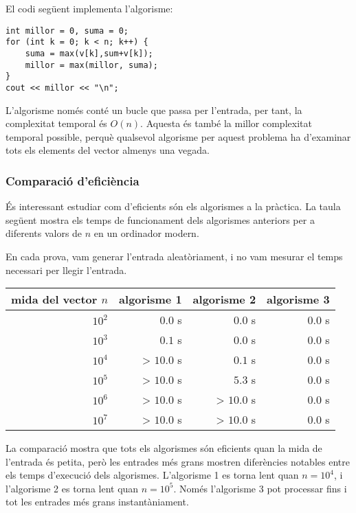 El codi següent implementa l'algorisme:
\begin{lstlisting}
int millor = 0, suma = 0;
for (int k = 0; k < n; k++) {
    suma = max(v[k],sum+v[k]);
    millor = max(millor, suma);
}
cout << millor << "\n";
\end{lstlisting}

L'algorisme només conté un bucle
que passa per l'entrada,
per tant, la complexitat temporal és $O(n)$.
Aquesta és també la millor complexitat temporal possible,
perquè qualsevol algorisme per aquest problema
ha d'examinar tots els elements del vector almenys una vegada.

\subsubsection{Comparació d'eficiència}

És interessant estudiar com d'eficients són
els algorismes a la pràctica.
La taula següent mostra els temps de funcionament
dels algorismes anteriors per a diferents
valors de $n$ en un ordinador modern.

En cada prova, vam generar l'entrada aleatòriament, i
no vam mesurar el temps necessari per llegir l'entrada.

\begin{center}
\begin{tabular}{rrrr}
mida del vector $n$ & algorisme 1 & algorisme 2 & algorisme 3 \\
\hline
$10^2$ & $0.0$ s & $0.0$ s & $0.0$ s \\
$10^3$ & $0.1$ s & $0.0$ s & $0.0$ s \\
$10^4$ & > $10.0$ s & $0.1$ s & $0.0$ s \\
$10^5$ & > $10.0$ s & $5.3$ s & $0.0$ s \\
$10^6$ & > $10.0$ s & > $10.0$ s & $0.0$ s \\
$10^7$ & > $10.0$ s & > $10.0$ s & $0.0$ s \\
\end{tabular}
\end{center}

La comparació mostra que tots els algorismes
són eficients quan la mida de l'entrada és petita,
però les entrades més grans mostren diferències
notables entre els temps d'execució dels algorismes.
L'algorisme 1 es torna lent
quan $n=10^4$, i l'algorisme 2
es torna lent quan $n=10^5$.
Només l'algorisme 3 pot processar
fins i tot les entrades més grans instantàniament.
